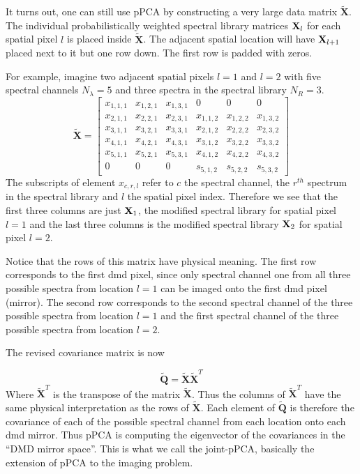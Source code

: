 It turns out, one can still use pPCA by constructing a very large data matrix $\tilde{\mathbf{X}}$. The individual probabilistically weighted spectral library matrices $\mathbf{X}_l$ for each spatial pixel $l$ is placed inside $\tilde{\mathbf{X}}$. The adjacent spatial location will have $\mathbf{X}_{l+1}$ placed next to it but one row down. The first row is padded with zeros. 

For example, imagine two adjacent spatial pixels $l = 1$ and $l = 2$ with five spectral channels $N_{\lambda} = 5$ and three spectra in the spectral library $N_R = 3$.
\begin{equation}
\tilde{\mathbf{X}} =
\begin{bmatrix}
    x_{1,1,1}  & x_{1,2,1} & x_{1,3,1} 	& 0 	    & 0 		& 0 \\
    x_{2,1,1}  & x_{2,2,1} & x_{2,3,1} 	& x_{1,1,2} & x_{1,2,2} & x_{1,3,2} \\
    x_{3,1,1}  & x_{3,2,1} & x_{3,3,1} 	& x_{2,1,2} & x_{2,2,2} & x_{2,3,2} \\
    x_{4,1,1}  & x_{4,2,1} & x_{4,3,1} 	& x_{3,1,2} & x_{3,2,2} & x_{3,3,2} \\
    x_{5,1,1}  & x_{5,2,1} & x_{5,3,1} 	& x_{4,1,2} & x_{4,2,2} & x_{4,3,2} \\
    0		   & 0	       & 0      			& s_{5,1,2} & s_{5,2,2} & s_{5,3,2} 
\end{bmatrix}
\end{equation}
%
The subscripts of element $x_{c,r,l}$ refer to $c$ the spectral channel, the $r^{th}$ spectrum in the spectral library and $l$ the spatial pixel index. Therefore we see that the first three columns are just $\mathbf{X}_1$, the modified spectral library for spatial pixel $l=1$ and the last three columns is the modified spectral library $\mathbf{X}_2$ for spatial pixel $l = 2$.

Notice that the rows of this matrix have physical meaning. The first row corresponds to the first \gls{dmd} pixel, since only spectral channel one from all three possible spectra from location $l = 1$ can be imaged onto the first \gls{dmd} pixel (mirror). The second row corresponds to the second spectral channel of the three possible spectra from location $l = 1$ and the first spectral channel of the three possible spectra from location $l = 2$.  

The revised covariance matrix is now

\begin{equation}
\tilde{\mathbf{Q}} = \tilde{\mathbf{X}} \tilde{\mathbf{X}}^{T}
\end{equation}
%
Where $\tilde{\mathbf{X}}^{T}$ is the transpose of the matrix $\tilde{\mathbf{X}}$. Thus the columns of $\tilde{\mathbf{X}}^{T}$ have the same physical interpretation as the rows of $ \tilde{\mathbf{X}}$. Each element of $\tilde{\mathbf{Q}}$ is therefore the covariance of each of the possible spectral channel from each location onto each \gls{dmd} mirror. Thus pPCA is computing the eigenvector of the covariances in the ``DMD mirror space''. This is what we call the joint-pPCA, basically the extension of pPCA to the imaging problem.  


